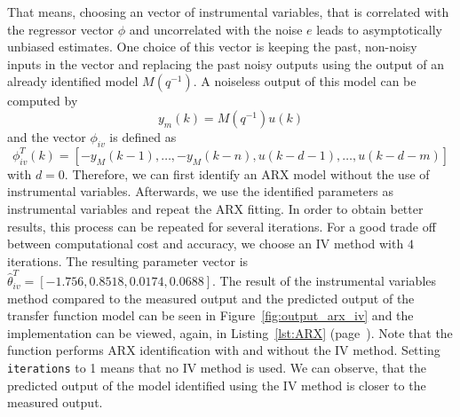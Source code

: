 That means, choosing an vector of instrumental variables, that is correlated with the regressor vector $\phi$ and uncorrelated with the noise $e$ leads to asymptotically unbiased estimates.
One choice of this vector is keeping the past, non-noisy inputs in the vector and replacing the past noisy outputs using the output of an already identified model $M(q^{-1})$. A noiseless output of this model can be computed by 
\begin{equation}
y_m(k) = M(q^{-1}) u(k)
\end{equation}
and the vector $\phi_{iv}$ is defined as
\begin{equation}
\phi_{iv}^T(k) = \left[-y_M(k-1),\ldots,-y_M(k-n),u(k-d-1),\ldots,u(k-d-m)\right]
\end{equation}
with $d=0$. 
Therefore, we can first identify an ARX model without the use of instrumental variables. 
Afterwards, we use the identified parameters as instrumental variables and repeat the ARX fitting.
In order to obtain better results, this process can be repeated for several iterations. 
For a good trade off between computational cost and accuracy, we choose an IV method with $4$ iterations. 
The resulting parameter vector is $\hat{\theta}_{iv}^T = \left[-1.756, 0.8518, 0.0174, 0.0688\right]$.
The result of the instrumental variables method compared to the measured output and the predicted output of the transfer function model can be seen in Figure~\ref{fig:output_arx_iv} and the implementation can be viewed, again, in Listing~\ref{lst:ARX} (page~\pageref{lst:ARX}).
Note that the function performs ARX identification with and without the IV method.
Setting \texttt{iterations} to 1 means that no IV method is used.
We can observe, that the predicted output of the model identified using the IV method is closer to the measured output.


